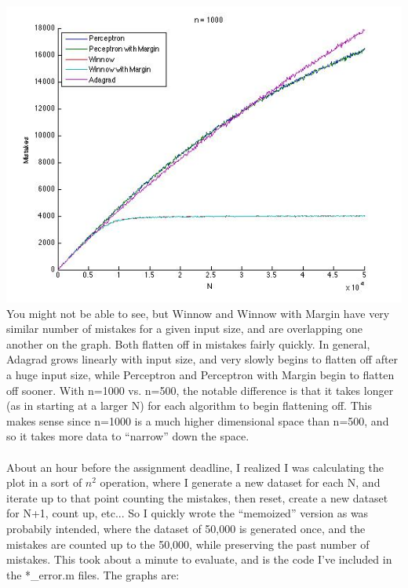 \begin{enumerate}
  \includegraphics[scale=0.5]{HW3_code/n1000}\\
You might not be able to see, but Winnow and Winnow with Margin have very similar number of mistakes for a given input size, and are overlapping one another on the graph. Both flatten off in mistakes fairly quickly. In general, Adagrad grows linearly with input size, and very slowly begins to flatten off after a huge input size, while Perceptron and Perceptron with Margin begin to flatten off sooner. With n=1000 vs. n=500, the notable difference is that it takes longer (as in starting at a larger N) for each algorithm to begin flattening off. This makes sense since n=1000 is a much higher dimensional space than n=500, and so it takes more data to ``narrow'' down the space.\\\\
About an hour before the assignment deadline, I realized I was calculating the plot in a sort of $n^2$ operation, where I generate a new dataset for each N, and iterate up to that point counting the mistakes, then reset, create a new dataset for N+1, count up, etc... So I quickly wrote the ``memoized'' version as was probabily intended, where the dataset of 50,000 is generated once, and the mistakes are counted up to the 50,000, while preserving the past number of mistakes. This took about a minute to evaluate, and is the code I've included in the *\_error.m files. The graphs are:

\end{enumerate}
